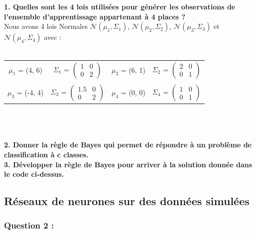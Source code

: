 \documentclass[a4paper, 10pt]{article}
\begin{document}
\textbf{1. Quelles sont les 4 lois utilisées pour générer les observations de l’ensemble d’apprentissage appartenant à 4 places ?}\\
Nous avons 4 lois Normales $\mathcal{N}(\mu_{1}, \Sigma_{1})$, $\mathcal{N}(\mu_{2}, \Sigma_{2})$, $\mathcal{N}(\mu_{3}, \Sigma_{3})$ et $\mathcal{N}(\mu_{4}, \Sigma_{4})$ avec :\\ \\
\hspace*{0.5cm}
\begin{tabular}{cccc}
$\mu_{1}$ = (4, 6) &
$\Sigma_{1}$ = $\begin{pmatrix} 1 & 0 \\ 0 & 2 \end{pmatrix}$ &
$\mu_{2}$ = (6, 1) &
$\Sigma_{2}$ = $\begin{pmatrix} 2 & 0 \\ 0 & 1 \end{pmatrix}$\\ \\
$\mu_{3}$ = (-4, 4) &
$\Sigma_{3}$ = $\begin{pmatrix} 1.5 & 0 \\ 0 & 2 \end{pmatrix}$ &
$\mu_{4}$ = (0, 0) &
$\Sigma_{4}$ = $\begin{pmatrix} 1 & 0 \\ 0 & 1 \end{pmatrix}$\\
\end{tabular}\\ \\ \\
\textbf{2. Donner la règle de Bayes qui permet de répondre à un problème de classification à c classes.}\\
\textbf{3. Développer la règle de Bayes pour arriver à la solution donnée dans le code ci-dessus.}\\

\subsection*{Réseaux de neurones sur des données simulées}

\subsubsection*{Question 2 :}
\end{document}

